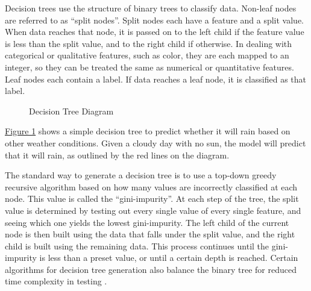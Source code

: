 \documentclass[12pt]{article}
\begin{document}
Decision trees use the structure of binary trees to classify data. Non-leaf nodes are referred to as ``split nodes''. Split nodes each have a feature and a split value. When data reaches that node, it is passed on to the left child if the feature value is less than the split value, and to the right child if otherwise. In dealing with categorical or qualitative features, such as color, they are each mapped to an integer, so they can be treated the same as numerical or quantitative features. Leaf nodes each contain a label. If data reaches a leaf node, it is classified as that label.

\begin{figure}[H]
    \centering
    \caption{Decision Tree Diagram}
    \label{fig:decisiontree}
\end{figure}

\hyperref[fig:decisiontree]{Figure 1} shows a simple decision tree to predict whether it will rain based on other weather conditions. Given a cloudy day with no sun, the model will predict that it will rain, as outlined by the red lines on the diagram.

The standard way to generate a decision tree is to use a top-down greedy recursive algorithm based on how many values are incorrectly classified at each node. This value is called the ``gini-impurity''. At each step of the tree, the split value is determined by testing out every single value of every single feature, and seeing which one yields the lowest gini-impurity. The left child of the current node is then built using the data that falls under the split value, and the right child is built using the remaining data. This process continues until the gini-impurity is less than a preset value, or until a certain depth is reached. Certain algorithms for decision tree generation also balance the binary tree for reduced time complexity in testing \cite{scikit-learn}.
\end{document}

